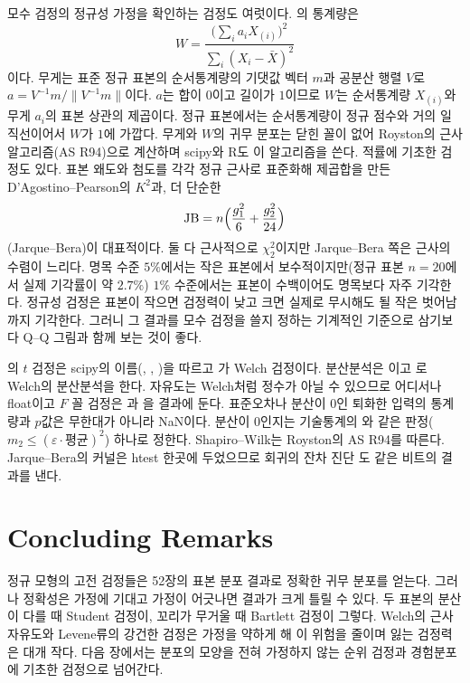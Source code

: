 모수 검정의 정규성 가정을 확인하는 검정도 여럿이다. 의 통계량은
\[
W=\frac{\bigl(\sum_ia_iX_{(i)}\bigr)^2}{\sum_i(X_i-\bar X)^2}
\]
이다\cite{shapiro1965}. 무게는 표준 정규 표본의 순서통계량의 기댓값 벡터 $m$과 공분산 행렬 $V$로 $a=V^{-1}m/\|V^{-1}m\|$이다. $a$는 합이 $0$이고 길이가 $1$이므로 $W$는 순서통계량 $X_{(i)}$와 무게 $a_i$의 표본 상관의 제곱이다. 정규 표본에서는 순서통계량이 정규 점수와 거의 일직선이어서 $W$가 $1$에 가깝다. 무게와 $W$의 귀무 분포는 닫힌 꼴이 없어 Royston의 근사 알고리즘(AS R94)으로 계산하며\cite{royston1995} scipy와 R도 이 알고리즘을 쓴다. 적률에 기초한 검정도 있다. 표본 왜도와 첨도를 각각 정규 근사로 표준화해 제곱합을 만든 D'Agostino--Pearson의 $K^2$\cite{dagostino1973}과, 더 단순한
\[
\mathrm{JB}=n\Bigl(\frac{g_1^2}6+\frac{g_2^2}{24}\Bigr)
\]
(Jarque--Bera\cite{jarque1980})이 대표적이다. 둘 다 근사적으로 $\chi^2_2$이지만 Jarque--Bera 쪽은 근사의 수렴이 느리다. 명목 수준 $5\%$에서는 작은 표본에서 보수적이지만(정규 표본 $n=20$에서 실제 기각률이 약 $2.7\%$) $1\%$ 수준에서는 표본이 수백이어도 명목보다 자주 기각한다. 정규성 검정은 표본이 작으면 검정력이 낮고 크면 실제로 무시해도 될 작은 벗어남까지 기각한다. 그러니 그 결과를 모수 검정을 쓸지 정하는 기계적인 기준으로 삼기보다 Q--Q 그림과 함께 보는 것이 좋다.

\begin{instardust}
의 $t$ 검정은 scipy의 이름(, , )을 따르고 가 Welch 검정이다. 분산분석은 이고 로 Welch의 분산분석을 한다. 자유도는 Welch처럼 정수가 아닐 수 있으므로 어디서나 float이고 $F$ 꼴 검정은 과 을 결과에 둔다. 표준오차나 분산이 $0$인 퇴화한 입력의 통계량과 $p$값은 무한대가 아니라 NaN이다. 분산이 $0$인지는 기술통계의 와 같은 판정($m_2\le(\varepsilon\cdot\text{평균})^2$) 하나로 정한다. Shapiro--Wilk는 Royston의 AS R94를 따른다. Jarque--Bera의 커널은 htest 한곳에 두었으므로 회귀의 잔차 진단 도 같은 비트의 결과를 낸다.
\end{instardust}

\section{Concluding Remarks}

정규 모형의 고전 검정들은 52장의 표본 분포 결과로 정확한 귀무 분포를 얻는다. 그러나 정확성은 가정에 기대고 가정이 어긋나면 결과가 크게 틀릴 수 있다. 두 표본의 분산이 다를 때 Student 검정이, 꼬리가 무거울 때 Bartlett 검정이 그렇다. Welch의 근사 자유도와 Levene류의 강건한 검정은 가정을 약하게 해 이 위험을 줄이며 잃는 검정력은 대개 작다. 다음 장에서는 분포의 모양을 전혀 가정하지 않는 순위 검정과 경험분포에 기초한 검정으로 넘어간다.

\chapterreferences
